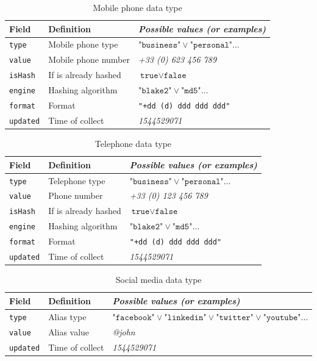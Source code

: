 \documentclass[twoside,twocolumn]{article}
\theoremstyle{definition}
\theoremstyle{remark}
\begin{document}
\begin{table*}
    \centering
    \caption{Mobile phone data type}
    \begin{tabular*}{0.75\textwidth}{l|l||l}
        Field & Definition & \textit{Possible values (or examples)} \\
        \hline \hline
        \texttt{type} & Mobile phone type & $\texttt{"business"} \vee \texttt{"personal"} \dots$ \\
        \hline
        \texttt{value} & Mobile phone number & \textit{+33 (0) 623 456 789} \\
        \hline
        \texttt{isHash} & If is already hashed & $\texttt{true} \vee \texttt{false}$ \\
        \hline
        \texttt{engine} & Hashing algorithm & $\texttt{"blake2"} \vee \texttt{"md5"} \dots$ \\
        \hline
        \texttt{format} & Format & \texttt{"+dd (d) ddd ddd ddd"} \\
        \hline
        \texttt{updated} & Time of collect & \textit{1544529071}
        \label{table:mobiles}
    \end{tabular*}
\end{table*}

\begin{table*}
    \centering
    \caption{Telephone data type}
    \begin{tabular*}{0.75\textwidth}{l|l||l}
        Field & Definition & \textit{Possible values (or examples)} \\
        \hline \hline
        \texttt{type} & Telephone type & $\texttt{"business"} \vee \texttt{"personal"} \dots$ \\
        \hline
        \texttt{value} & Phone number & \textit{+33 (0) 123 456 789} \\
        \hline
        \texttt{isHash} & If is already hashed & $\texttt{true} \vee \texttt{false}$ \\
        \hline
        \texttt{engine} & Hashing algorithm & $\texttt{"blake2"} \vee \texttt{"md5"} \dots$ \\
        \hline
        \texttt{format} & Format & \texttt{"+dd (d) ddd ddd ddd"} \\
        \hline
        \texttt{updated} & Time of collect & \textit{1544529071}
        \label{table:phones}
    \end{tabular*}
\end{table*}

\begin{table*}
    \centering
    \caption{Social media data type}
    \begin{tabular*}{0.9\textwidth}{l|l||l}
        Field & Definition & \textit{Possible values (or examples)} \\
        \hline \hline
        \texttt{type} & Alias type & $\texttt{"facebook"} \vee \texttt{"linkedin"} \vee \texttt{"twitter"} \vee \texttt{"youtube"} \dots$ \\
        \hline
        \texttt{value} & Alias value & \textit{@john} \\
        \hline
        \texttt{updated} & Time of collect & \textit{1544529071}
        \label{table:socials}
    \end{tabular*}
\end{table*}
\end{document}
